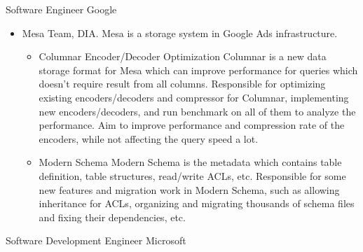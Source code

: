 \documentclass[10pt,a4paper,roman]{moderncv} %
\begin{document}
        {Software Engineer}
        {}
        {Google}
        {}
        {\begin{itemize}%
         \item Mesa Team, DIA.
               Mesa\footnotemark[2]{} is a storage system in Google Ads infrastructure.
               \begin{itemize}%
               \item Columnar Encoder/Decoder Optimization\newline{}%
                     Columnar is a new data storage format for Mesa which can improve performance for queries which doesn't require result from all columns.
                     Responsible for optimizing existing encoders/decoders and compressor for Columnar, implementing new encoders/decoders, and run benchmark on all of them to analyze the performance.
                     Aim to improve performance and compression rate of the encoders, while not affecting the query speed a lot.
               \item Modern Schema\newline{}%
                     Modern Schema is the metadata which contains table definition, table structures, read/write ACLs, etc.
                     Responsible for some new features and migration work in Modern Schema, such as allowing inheritance for ACLs, organizing and migrating thousands of schema files and fixing their dependencies, etc.
               \end{itemize}
         \end{itemize}}
        {Software Development Engineer}
        {}
        {Microsoft}
        {}
\end{document}
